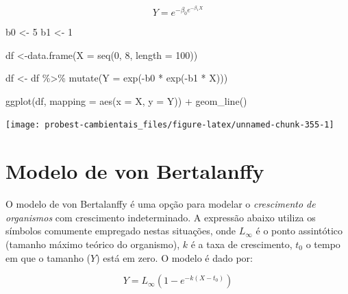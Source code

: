 \documentclass[
]{book}
\newenvironment{Shaded}{\begin{snugshade}}{\end{snugshade}}
\newcommand{\AttributeTok}[1]{\textcolor[rgb]{0.77,0.63,0.00}{#1}}
\newcommand{\DecValTok}[1]{\textcolor[rgb]{0.00,0.00,0.81}{#1}}
\newcommand{\FunctionTok}[1]{\textcolor[rgb]{0.00,0.00,0.00}{#1}}
\newcommand{\NormalTok}[1]{#1}
\newcommand{\OtherTok}[1]{\textcolor[rgb]{0.56,0.35,0.01}{#1}}
\newcommand{\SpecialCharTok}[1]{\textcolor[rgb]{0.00,0.00,0.00}{#1}}
\begin{document}
\[Y = e^{-\beta_0 e^{-\beta_1 X}}\]

\begin{Shaded}
\begin{Highlighting}[]
\NormalTok{b0 }\OtherTok{\textless{}{-}} \DecValTok{5}
\NormalTok{b1 }\OtherTok{\textless{}{-}} \DecValTok{1}

\NormalTok{df }\OtherTok{\textless{}{-}}\FunctionTok{data.frame}\NormalTok{(}\AttributeTok{X =} \FunctionTok{seq}\NormalTok{(}\DecValTok{0}\NormalTok{, }\DecValTok{8}\NormalTok{, }\AttributeTok{length =} \DecValTok{100}\NormalTok{))}

\NormalTok{df }\OtherTok{\textless{}{-}}\NormalTok{ df }\SpecialCharTok{\%\textgreater{}\%} \FunctionTok{mutate}\NormalTok{(}\AttributeTok{Y =} \FunctionTok{exp}\NormalTok{(}\SpecialCharTok{{-}}\NormalTok{b0 }\SpecialCharTok{*} \FunctionTok{exp}\NormalTok{(}\SpecialCharTok{{-}}\NormalTok{b1 }\SpecialCharTok{*}\NormalTok{ X)))}

\FunctionTok{ggplot}\NormalTok{(df, }\AttributeTok{mapping =} \FunctionTok{aes}\NormalTok{(}\AttributeTok{x =}\NormalTok{ X, }\AttributeTok{y =}\NormalTok{ Y)) }\SpecialCharTok{+}
  \FunctionTok{geom\_line}\NormalTok{()}
\end{Highlighting}
\end{Shaded}

\begin{center}\texttt{[image: probest-cambientais\_files/figure-latex/unnamed-chunk-355-1]} \end{center}

\hypertarget{modelo-de-von-bertalanffy}{%
\section{Modelo de von Bertalanffy}\label{modelo-de-von-bertalanffy}}

O modelo de von Bertalanffy é uma opção para modelar o \emph{crescimento de organismos} com crescimento indeterminado. A expressão abaixo utiliza os símbolos comumente empregado nestas situações, onde \(L_{\infty}\) é o ponto assintótico (tamanho máximo teórico do organismo), \(k\) é a taxa de crescimento, \(t_0\) o tempo em que o tamanho (\(Y\)) está em zero. O modelo é dado por:

\[Y = L_{\infty} (1 - e^{-k(X - t_0)})\]
\end{document}
